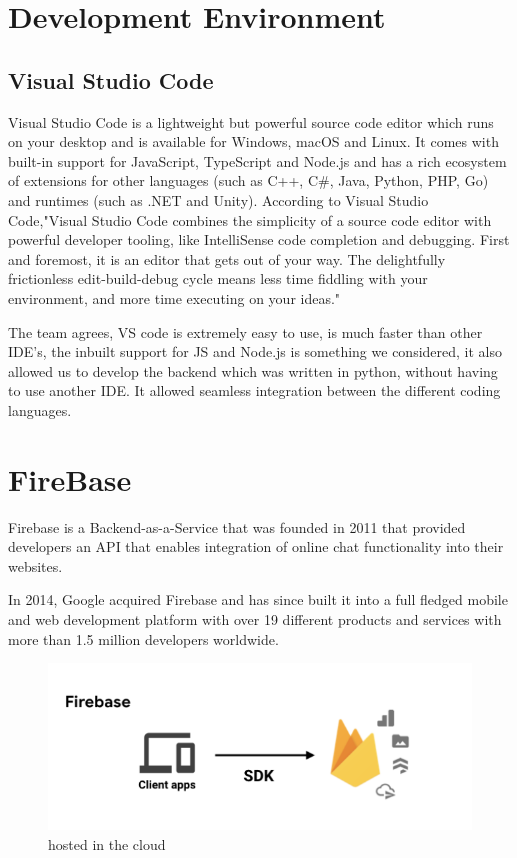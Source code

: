 \section{Development Environment}
\subsection{Visual Studio Code}
Visual Studio Code is a lightweight but powerful source code editor which runs on your desktop and is available for Windows, macOS and Linux. It comes with built-in support for JavaScript, TypeScript and Node.js and has a rich ecosystem of extensions for other languages (such as C++, C\#, Java, Python, PHP, Go) and runtimes (such as .NET and Unity).\cite{vscode}
According to Visual Studio Code,"Visual Studio Code combines the simplicity of a source code editor with powerful developer tooling, like IntelliSense code completion and debugging.
First and foremost, it is an editor that gets out of your way. The delightfully frictionless edit-build-debug cycle means less time fiddling with your environment, and more time executing on your ideas."\cite{whyvscode}

\vspace{5mm}
The team agrees, VS code is extremely easy to use, is much faster than other IDE's, the inbuilt support for JS and Node.js is something we considered, it also allowed us to develop the backend which was written in python, without having to use another IDE. It allowed seamless integration between the different coding languages.


\section{FireBase}
Firebase is a Backend-as-a-Service that was founded in 2011 that provided developers an API that enables integration of online chat functionality into their websites. 

In 2014, Google acquired Firebase and has since built it into a full fledged mobile and web development platform with over 19 different products and services with more than 1.5 million developers worldwide.

\begin{figure}[ht]
    \centering
    \includegraphics[scale=0.8]{img/firebase2.PNG}
    \caption{hosted in the cloud}
    \label{fig:my_label}
\end{figure}



